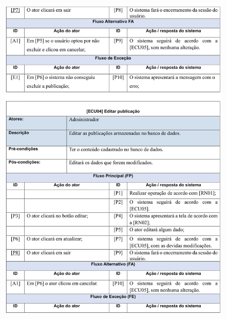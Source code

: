 \begin{figure}
    \includegraphics[width=\textwidth]{documentacao/ModeloArtefatos-08.jpg}
\end{figure}

